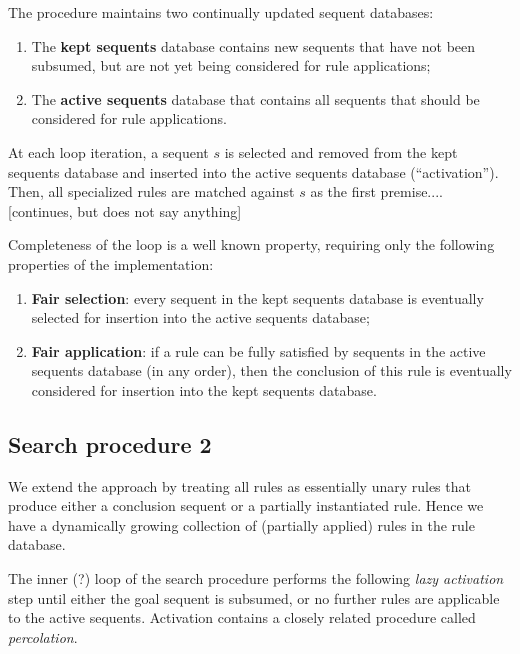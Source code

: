 \documentclass{article}
\newcommand{\strong}[1]{\textbf{#1}}
\begin{document}
The procedure maintains two continually updated sequent databases:

\begin{enumerate}
\item The \strong{kept sequents} database contains new sequents that have not
  been subsumed, but are not yet being considered for rule applications;
\item The \strong{active sequents} database that contains all sequents that
  should be considered for rule applications.
\end{enumerate}

At each loop iteration, a sequent $s$ is selected and removed from the kept
sequents database and inserted into the active sequents database
(``activation''). Then, all specialized rules are matched against $s$ as the
first premise.... [continues, but does not say anything]

Completeness of the loop is a well known property, requiring only the following
properties of the implementation:

\begin{enumerate}
\item \strong{Fair selection}: every sequent in the kept sequents database is
  eventually selected for insertion into the active sequents database;
\item \strong{Fair application}: if a rule can be fully satisfied by sequents in
  the active sequents database (in any order), then the conclusion of this rule
  is eventually considered for insertion into the kept sequents database.
\end{enumerate}

\subsection{Search procedure 2}


We extend the approach by treating all rules as essentially unary rules that
produce either a conclusion sequent or a partially instantiated rule. Hence we
have a dynamically growing collection of (partially applied) rules in the rule
database.

The inner (?) loop of the search procedure performs the following \emph{lazy
  activation} step until either the goal sequent is subsumed, or no further
rules are applicable to the active sequents. Activation contains a closely
related procedure called \emph{percolation}.
\end{document}
